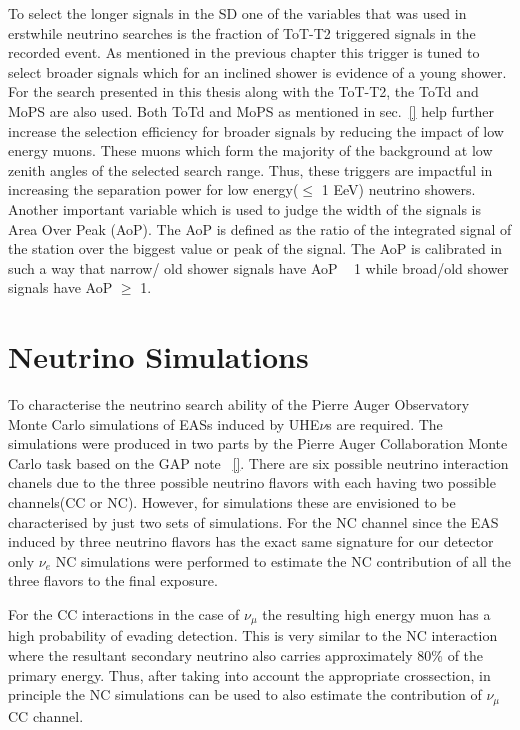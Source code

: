 To select the longer signals in the SD one of the variables that was used in erstwhile neutrino searches is the fraction of ToT-T2 triggered signals in the recorded event. As mentioned in the previous chapter this trigger is tuned to select broader signals which for an inclined shower is evidence of a young shower. For the search presented in this thesis along with the ToT-T2, the ToTd and MoPS are also used. Both ToTd and MoPS as mentioned in sec.~\ref{} help further increase the selection efficiency for broader signals by reducing the impact of low energy muons. These muons which form the majority of the background at low zenith angles of the selected search range. Thus, these triggers are impactful in increasing the separation power for low energy($\leq$ 1 EeV) neutrino showers. Another important variable which is used to judge the width of the signals is Area Over Peak (AoP). The AoP is defined as the ratio of the integrated signal of the station over the biggest value or peak of the signal. The AoP is calibrated in such a way that narrow/ old shower signals have AoP ~ 1 while broad/old shower signals have AoP $\geqslant $ 1. 



\section{Neutrino Simulations}
\label{sec:sim_DGL}
To characterise the neutrino search ability of the Pierre Auger Observatory Monte Carlo simulations of EASs induced by UHE$\nu$s are required. The simulations were produced in two parts by the Pierre Auger Collaboration Monte Carlo task based on the GAP note ~\ref{}. There are six possible neutrino interaction chanels due to the three possible neutrino flavors with each having two possible channels(CC or NC). However, for simulations these are envisioned to be characterised by just two sets of simulations. For the NC channel since the EAS induced by three neutrino flavors has the exact same signature for our detector only $\nu_e$ NC simulations were performed to estimate the NC contribution of all the three flavors to the final exposure. 

For the CC interactions in the case of $\nu_{\mu}$ the resulting high energy muon has a high probability of evading detection. This is very similar to the NC interaction where the resultant secondary neutrino also carries approximately 80\% of the primary energy. Thus, after taking into account the appropriate crossection, in principle the NC simulations can be used to also estimate the contribution of $\nu_{\mu}$ CC channel.  

